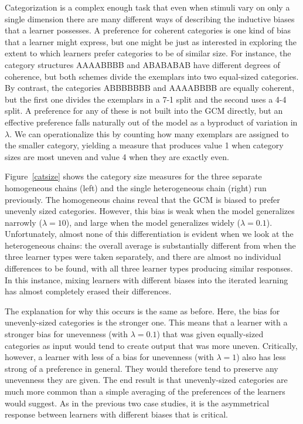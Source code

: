 \documentclass[doc]{apa6}
\begin{document}
Categorization is a complex enough task that even when stimuli vary on only a single dimension there are many different ways of describing the inductive biases that a learner possesses. A preference for coherent categories is one kind of bias that a learner might express, but one might be just as interested in exploring the extent to which learners prefer categories to be of similar size. For instance, the category structures AAAABBBB and ABABABAB have different degrees of coherence, but both schemes divide the exemplars into two equal-sized categories. By contrast, the categories ABBBBBBB and AAAABBBB are equally coherent, but the first one divides the exemplars in a 7-1 split and the second uses a 4-4 split. A preference for any of these is not built into the GCM directly, but an effective preference falls naturally out of the model as a byproduct of variation in $\lambda$. We can operationalize this by counting how many exemplars are assigned to the smaller category, yielding a measure that produces value 1 when category sizes are most uneven and value 4 when they are exactly even.

Figure~\ref{catsize} shows the category size measures for the three separate homogeneous chains (left) and the single heterogeneous chain (right) run previously. The homogeneous chains reveal that the GCM is biased to prefer unevenly sized categories. However, this bias is weak when the model generalizes narrowly ($\lambda=10$), and large when the model generalizes widely ($\lambda=0.1$). Unfortunately, almost none of this differentiation is evident when we look at the heterogeneous chains: the overall average is substantially different from when the three learner types were taken separately, and there are almost no individual differences to be found, with all three learner types producing similar responses. In this instance, mixing learners with different biases into the iterated learning has almost completely erased their differences.

The explanation for why this occurs is the same as before. Here, the bias for unevenly-sized categories is the stronger one. This means that a learner with a stronger bias for unevenness (with $\lambda=0.1$) that was given equally-sized categories as input would tend to create output that was more uneven. Critically, however, a learner with less of a bias for unevenness (with $\lambda=1$) also has less strong of a preference in general. They would therefore tend to preserve any unevenness they are given. The end result is that unevenly-sized categories are much more common than a simple averaging of the preferences of the learners would suggest. As in the previous two case studies, it is the asymmetrical response between learners with different biases that is critical.
\end{document}
